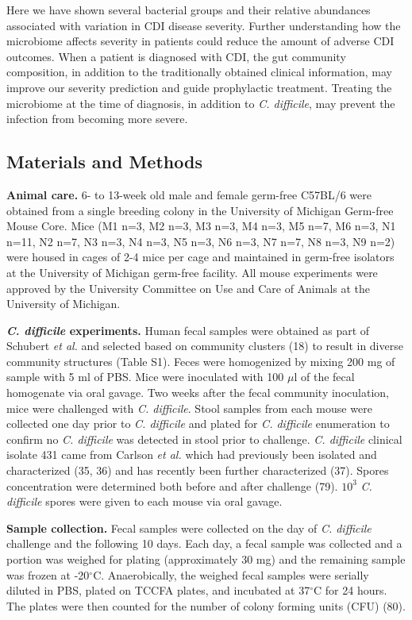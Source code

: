 \documentclass[
  12pt,
]{article}
\begin{document}
Here we have shown several bacterial groups and their relative
abundances associated with variation in CDI disease severity. Further
understanding how the microbiome affects severity in patients could
reduce the amount of adverse CDI outcomes. When a patient is diagnosed
with CDI, the gut community composition, in addition to the
traditionally obtained clinical information, may improve our severity
prediction and guide prophylactic treatment. Treating the microbiome at
the time of diagnosis, in addition to \emph{C. difficile}, may prevent
the infection from becoming more severe.

\hypertarget{materials-and-methods}{%
\subsection{Materials and Methods}\label{materials-and-methods}}

\textbf{Animal care.} 6- to 13-week old male and female germ-free
C57BL/6 were obtained from a single breeding colony in the University of
Michigan Germ-free Mouse Core. Mice (M1 n=3, M2 n=3, M3 n=3, M4 n=3, M5
n=7, M6 n=3, N1 n=11, N2 n=7, N3 n=3, N4 n=3, N5 n=3, N6 n=3, N7 n=7, N8
n=3, N9 n=2) were housed in cages of 2-4 mice per cage and maintained in
germ-free isolators at the University of Michigan germ-free facility.
All mouse experiments were approved by the University Committee on Use
and Care of Animals at the University of Michigan.

\textbf{\emph{C. difficile} experiments.} Human fecal samples were
obtained as part of Schubert \emph{et al.} and selected based on
community clusters (18) to result in diverse community structures (Table
S1). Feces were homogenized by mixing 200 mg of sample with 5 ml of PBS.
Mice were inoculated with 100 \(\mu\)l of the fecal homogenate via oral
gavage. Two weeks after the fecal community inoculation, mice were
challenged with \emph{C. difficile}. Stool samples from each mouse were
collected one day prior to \emph{C. difficile} and plated for \emph{C.
difficile} enumeration to confirm no \emph{C. difficile} was detected in
stool prior to challenge. \emph{C. difficile} clinical isolate 431 came
from Carlson \emph{et al.} which had previously been isolated and
characterized (35, 36) and has recently been further characterized (37).
Spores concentration were determined both before and after challenge
(79). \(10^{3}\) \emph{C. difficile} spores were given to each mouse via
oral gavage.

\textbf{Sample collection.} Fecal samples were collected on the day of
\emph{C. difficile} challenge and the following 10 days. Each day, a
fecal sample was collected and a portion was weighed for plating
(approximately 30 mg) and the remaining sample was frozen at
-20\(^\circ\)C. Anaerobically, the weighed fecal samples were serially
diluted in PBS, plated on TCCFA plates, and incubated at 37\(^\circ\)C
for 24 hours. The plates were then counted for the number of colony
forming units (CFU) (80).
\end{document}
